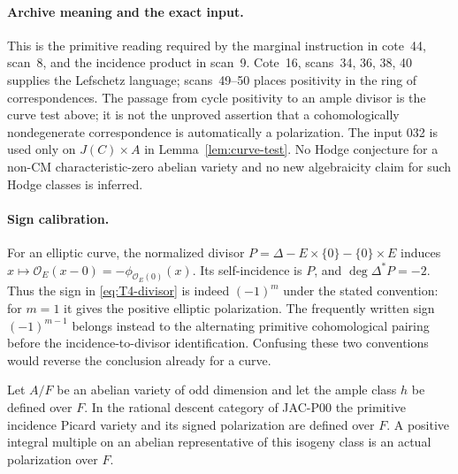 \paragraph{Archive meaning and the exact input.}
This is the primitive reading required by the marginal instruction in
cote~44, scan~8, and the incidence product in scan~9. Cote~16,
scans~34, 36, 38, 40 supplies the Lefschetz language; scans~49--50 places
positivity in the ring of correspondences. The passage from cycle
positivity to an ample divisor is the curve test above; it is not the
unproved assertion that a cohomologically nondegenerate correspondence
is automatically a polarization. The input 032 is used only on
$J(C)\times A$ in Lemma~\ref{lem:curve-test}. No Hodge conjecture for a
non-CM characteristic-zero abelian variety and no new algebraicity
claim for such Hodge classes is inferred.

\paragraph{Sign calibration.}
For an elliptic curve, the normalized divisor
$P=\Delta-E\times\{0\}-\{0\}\times E$ induces
$x\mapsto\mathcal O_E(x-0)=-\phi_{\mathcal O_E(0)}(x)$.
Its self-incidence is $P$, and $\deg\Delta^*P=-2$.
Thus the sign in \eqref{eq:T4-divisor} is indeed $(-1)^m$ under the
stated convention: for $m=1$ it gives the positive elliptic
polarization. The frequently written sign $(-1)^{m-1}$ belongs instead
to the alternating primitive cohomological pairing before the
incidence-to-divisor identification. Confusing these two conventions
would reverse the conclusion already for a curve.

\begin{corollary}
Let $A/F$ be an abelian variety of odd dimension and let the ample
class $h$ be defined over $F$. In the rational descent category of
JAC-P00 the primitive incidence Picard variety and its signed
polarization are defined over $F$. A positive integral multiple on an
abelian representative of this isogeny class is an actual polarization
over $F$.
\end{corollary}

